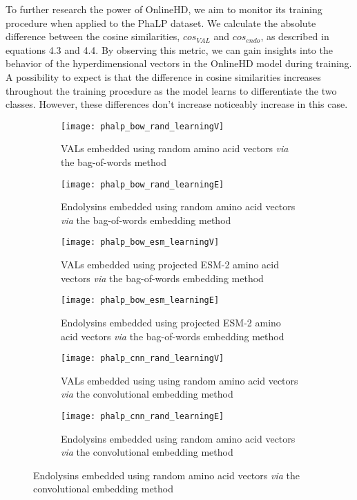 To further research the power of OnlineHD, we aim to monitor its training procedure when applied to the PhaLP dataset. We calculate the absolute difference between the cosine similarities, $cos_{VAL}$ and $cos_{endo}$, as described in equations 4.3 and 4.4. By observing this metric, we can gain insights into the behavior of the hyperdimensional vectors in the OnlineHD model during training. A possibility to expect is that the difference in cosine similarities increases throughout the training procedure as the model learns to differentiate the two classes. However, these differences don't increase noticeably increase in this case.

\begin{figure}[htbp]
    \centering
    \begin{subfigure}{0.48\textwidth}
        \texttt{[image: phalp\_bow\_rand\_learningV]}
        \caption{VALs embedded using random amino acid vectors \textit{via} the bag-of-words method}
        \label{fig:subfig-a}
    \end{subfigure}
    \hfill
    \begin{subfigure}{0.48\textwidth}
        \texttt{[image: phalp\_bow\_rand\_learningE]}
        \caption{Endolysins embedded using random amino acid vectors \textit{via} the bag-of-words embedding method}
        \label{fig:subfig-b}
    \end{subfigure}
    
    \begin{subfigure}{0.48\textwidth}
        \texttt{[image: phalp\_bow\_esm\_learningV]}
        \caption{VALs embedded using projected ESM-2 amino acid vectors \textit{via} the bag-of-words embedding method}
        \label{fig:subfig-c}
    \end{subfigure}
    \hfill
    \begin{subfigure}{0.48\textwidth}
        \texttt{[image: phalp\_bow\_esm\_learningE]}
        \caption{Endolysins embedded using projected ESM-2 amino acid vectors \textit{via} the bag-of-words embedding method}
        \label{fig:subfig-d}
    \end{subfigure}
    
    \begin{subfigure}{0.48\textwidth}
        \texttt{[image: phalp\_cnn\_rand\_learningV]}
        \caption{VALs embedded using using random amino acid vectors \textit{via} the convolutional embedding method}
        \label{fig:subfig-e}
    \end{subfigure}
    \hfill
    \begin{subfigure}{0.48\textwidth}
        \texttt{[image: phalp\_cnn\_rand\_learningE]}
        \caption{Endolysins embedded using random amino acid vectors \textit{via} the convolutional embedding method}
        \label{fig:subfig-f}
    \end{subfigure}
    

\end{figure}
